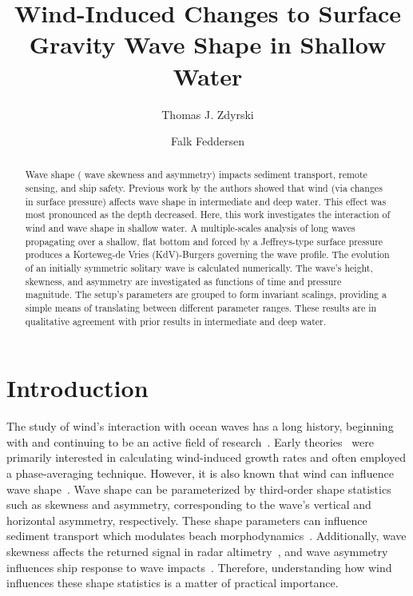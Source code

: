 \documentclass{jfm}
\title{Wind-Induced Changes to Surface Gravity Wave Shape in Shallow Water}
\author{Thomas J. Zdyrski \and Falk Feddersen}
\begin{document}
\maketitle

\begin{abstract}
Wave shape (\eg{} wave skewness and asymmetry) impacts sediment
transport, remote sensing, and ship safety.
Previous work by the authors showed that wind (via changes in surface
pressure) affects wave shape in intermediate and deep water.
This effect was most pronounced as the depth decreased.
Here, this work investigates the interaction of wind and wave shape in
shallow water.
A multiple-scales analysis of long waves propagating over a shallow,
flat bottom and forced by a Jeffreys-type surface pressure produces a
Korteweg-de Vries (KdV)-Burgers governing the wave profile.
The evolution of an initially symmetric solitary wave is calculated
numerically.
The wave's height, skewness, and asymmetry are investigated as functions
of time and pressure magnitude.
The setup's parameters are grouped to form invariant scalings,
providing a simple means of translating between different parameter
ranges.
These results are in qualitative agreement with prior results in
intermediate and deep water.
\end{abstract}

\section{Introduction}

The study of wind's interaction with ocean waves has a long history, beginning
with \citet{jeffreys1925formation} and continuing to be an active field
of
research~\citep[\eg][]{banner1976separation,touboul2006interaction,tian2013evolution}.
Early
theories~\citep[\eg][]{jeffreys1925formation,miles1957generation,phillips1957generation}
were primarily interested in calculating wind-induced growth rates
and often employed a phase-averaging technique.
However, it is also known that wind can influence wave
shape~\citep[\eg][]{leykin1995asymmetry,feddersen2005wind,zdyrski2020wind}.
Wave shape can be parameterized by third-order shape statistics such as
skewness and asymmetry, corresponding to the wave's vertical and
horizontal asymmetry, respectively.
These shape parameters can influence sediment transport \citep[\eg][]{drake2001discrete,
gonzalez2007seabed} which modulates beach
morphodynamics~\citep[\eg][]{hoefel2003wave}.
Additionally, wave skewness affects the returned signal in radar
altimetry~\citep[\eg][]{hayne1980radar,huang1983non},
and wave asymmetry influences ship response to wave
impacts~\citep[\eg][]{soares2008abnormal,oberhagemann2013prediction}.
Therefore, understanding how wind influences these shape statistics is a
matter of practical importance.
\end{document}
